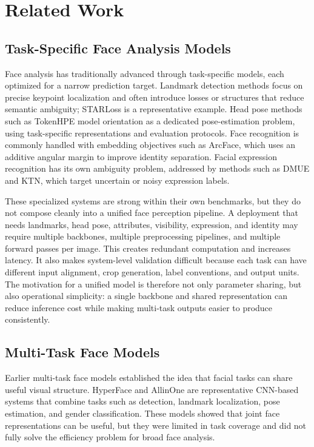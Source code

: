 \documentclass[11pt]{article}
\begin{document}
\section{Related Work}


\subsection{Task-Specific Face Analysis Models}


Face analysis has traditionally advanced through task-specific models, each optimized for a narrow prediction target. Landmark detection methods focus on precise keypoint localization and often introduce losses or structures that reduce semantic ambiguity; STARLoss is a representative example. Head pose methods such as TokenHPE model orientation as a dedicated pose-estimation problem, using task-specific representations and evaluation protocols. Face recognition is commonly handled with embedding objectives such as ArcFace, which uses an additive angular margin to improve identity separation. Facial expression recognition has its own ambiguity problem, addressed by methods such as DMUE and KTN, which target uncertain or noisy expression labels.


These specialized systems are strong within their own benchmarks, but they do not compose cleanly into a unified face perception pipeline. A deployment that needs landmarks, head pose, attributes, visibility, expression, and identity may require multiple backbones, multiple preprocessing pipelines, and multiple forward passes per image. This creates redundant computation and increases latency. It also makes system-level validation difficult because each task can have different input alignment, crop generation, label conventions, and output units. The motivation for a unified model is therefore not only parameter sharing, but also operational simplicity: a single backbone and shared representation can reduce inference cost while making multi-task outputs easier to produce consistently.


\subsection{Multi-Task Face Models}


Earlier multi-task face models established the idea that facial tasks can share useful visual structure. HyperFace and AllinOne are representative CNN-based systems that combine tasks such as detection, landmark localization, pose estimation, and gender classification. These models showed that joint face representations can be useful, but they were limited in task coverage and did not fully solve the efficiency problem for broad face analysis.
\end{document}
